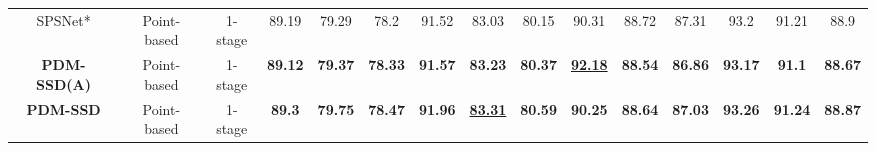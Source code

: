 \begin{table}
{\begin{tabular}{c|c|c|ccc|ccc|ccc|ccc}
		SPSNet* \cite{liang2023spsnet}                 & Point-based                & 1-stage               & 89.19          & 79.29          & 78.2           & 91.52          & 83.03                  & 80.15          & 90.31                  & 88.72          & 87.31          & 93.2           & 91.21          & 88.9            \\
	\textbf{	PDM-SSD(A)}              & Point-based                & 1-stage               & \textbf{89.12} & \textbf{79.37} & \textbf{78.33} & \textbf{91.57} & \textbf{83.23}         & \textbf{80.37} & \textbf{\uline{92.18}} & \textbf{88.54} & \textbf{86.86} & \textbf{93.17} & \textbf{91.1}  & \textbf{88.67}  \\
		\textbf{PDM-SSD}                 & Point-based                & 1-stage               & \textbf{89.3}  & \textbf{79.75} & \textbf{78.47} & \textbf{91.96} & \textbf{\uline{83.31}} & \textbf{80.59} & \textbf{90.25}         & \textbf{88.64} & \textbf{87.03} & \textbf{93.26} & \textbf{91.24} & \textbf{88.87}  \\
		\bottomrule
	\end{tabular}}
\label{tabel2}
\end{table}